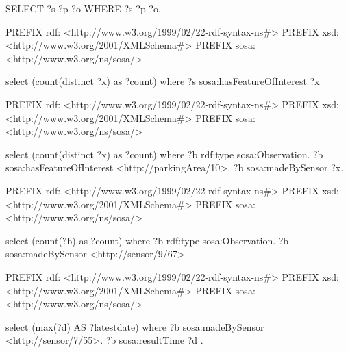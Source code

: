 \documentclass[english,version-2019-11]{uzl-thesis}
\begin{document}
\begin{SPARQL}[caption={Returns all triples.},
  float, label=appendix_query_1, morekeywords={@prefix}, captionpos=b]
SELECT ?s ?p ?o WHERE { ?s ?p ?o. }
\end{SPARQL}

\begin{SPARQL}[caption={Returns the number of parking areas.},
  float, label=appendix_query_2, morekeywords={@prefix}, captionpos=b]
PREFIX rdf: <http://www.w3.org/1999/02/22-rdf-syntax-ns#>
PREFIX xsd: <http://www.w3.org/2001/XMLSchema#>
PREFIX sosa: <http://www.w3.org/ns/sosa/>

select (count(distinct ?x) as ?count) 
where {
 ?s sosa:hasFeatureOfInterest ?x
}
\end{SPARQL}

\begin{SPARQL}[caption={Returns the number of parking spaces in area number 10. Assumption: Each parking space is observed by one sensor.},
  float, label=appendix_query_3, morekeywords={@prefix}, captionpos=b]
PREFIX rdf: <http://www.w3.org/1999/02/22-rdf-syntax-ns#>
PREFIX xsd: <http://www.w3.org/2001/XMLSchema#>
PREFIX sosa: <http://www.w3.org/ns/sosa/>

select  (count(distinct ?x) as ?count) 
where {
 ?b rdf:type sosa:Observation.
 ?b sosa:hasFeatureOfInterest  <http://parkingArea/10>.
 ?b sosa:madeBySensor ?x.   
}
\end{SPARQL}
\begin{SPARQL}[caption={Returns the number of samples from sensor number 67 from parking area number 9.},
  float, label=appendix_query_4, morekeywords={@prefix}, captionpos=b]
PREFIX rdf: <http://www.w3.org/1999/02/22-rdf-syntax-ns#>
PREFIX xsd: <http://www.w3.org/2001/XMLSchema#>
PREFIX sosa: <http://www.w3.org/ns/sosa/>

select (count(?b) as ?count) 
where {
 ?b rdf:type sosa:Observation.
 ?b sosa:madeBySensor <http://sensor/9/67>.   
}
\end{SPARQL}

\begin{SPARQL}[caption={Returns the latest sample of sensor number 55 from parking area number 7.},
  float, label=appendix_query_5, morekeywords={@prefix}, captionpos=b]
PREFIX rdf: <http://www.w3.org/1999/02/22-rdf-syntax-ns#>
PREFIX xsd: <http://www.w3.org/2001/XMLSchema#>
PREFIX sosa: <http://www.w3.org/ns/sosa/>

select (max(?d) AS ?latestdate)
where {
 ?b sosa:madeBySensor <http://sensor/7/55>.
 ?b sosa:resultTime ?d .
}
\end{SPARQL}
\end{document}
